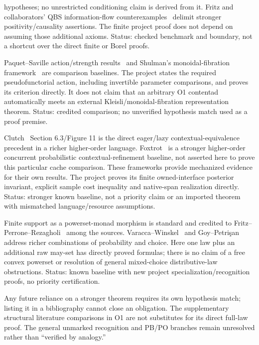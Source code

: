 \documentclass[11pt,a4paper]{article}
\theoremstyle{definition}
\begin{document}
\begin{description}[style=nextline]
hypotheses; no unrestricted conditioning claim is derived from it.
Fritz and collaborators' QBS information-flow counterexamples~\cite{Dilations} delimit
stronger positivity/causality assertions. The finite project proof does
not depend on assuming those additional axioms. Status: checked benchmark
and boundary, not a shortcut over the direct finite or Borel proofs.
\item[S05 Actions and monoidal fibrations.]
Paquet--Saville action/strength results~\cite{PaquetSaville} and Shulman's monoidal-fibration
framework~\cite{Shulman} are comparison baselines. The project states the required
pseudofunctorial action, including invertible parameter comparisons, and
proves its criterion directly. It does not claim that an arbitrary O1
contentad automatically meets an external Kleisli/monoidal-fibration
representation theorem. Status: credited comparison; no unverified
hypothesis match used as a proof premise.
\item[S06 Contextual couplings and lazy sampling.]
Clutch~\cite{Clutch} Section 6.3/Figure 11 is the direct eager/lazy
contextual-equivalence precedent in a richer higher-order language.
Foxtrot~\cite{Foxtrot} is a stronger higher-order concurrent probabilistic
contextual-refinement baseline, not asserted here to prove this particular
cache comparison. These frameworks provide mechanized evidence for their
own results. The project
proves its finite owned-interface posterior invariant, explicit sample
cost inequality and native-span realization directly. Status: stronger
known baseline, not a priority claim or an imported theorem with mismatched
language/resource assumptions.
\item[S07 Probability support and nondeterminism.]
Finite support as a powerset-monad morphism is standard and credited to
Fritz--Perrone--Rezagholi~\cite{FPR} among the sources. Varacca--Winskel~\cite{VW} and
Goy--Petri\c{s}an~\cite{GP} address richer combinations of probability and choice.
Here one law plus an additional raw may-set has directly proved formulas;
there is no claim of a free convex powerset or resolution of general
mixed-choice distributive-law obstructions. Status: known baseline with
new project specialization/recognition proofs, no priority certification.
\end{description}
Any future reliance on a stronger theorem requires its own hypothesis
match; listing it in a bibliography cannot close an obligation. The
supplementary structural literature comparisons in O1 are not substitutes
for its direct full-law proof. The general unmarked recognition and PB/PO
branches remain unresolved rather than ``verified by analogy.''
\end{document}

